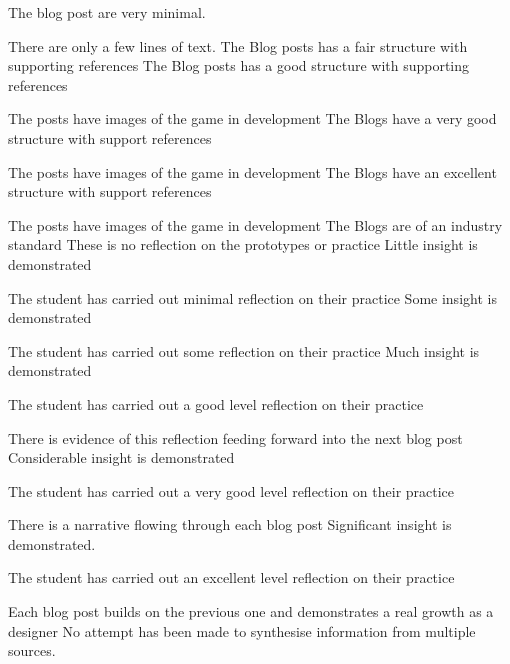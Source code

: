\documentclass{../../fal_assignment}
\begin{document}
\begin{markingrubric}
	\grade\fail	The blog post are very minimal.
	\par		There are only a few lines of text.
	\grade	    The Blog posts has a fair structure with supporting references
	\grade		The Blog posts has a good structure with supporting references
	\par		The posts have images of the game in development
	\grade		The Blogs have a very good structure with support references
	\par			The posts have images of the game in development
	\grade		The Blogs have an excellent structure with support references
	\par			The posts have images of the game in development
	\grade		The Blogs are of an industry standard
	\grade\fail These is no reflection on the prototypes or practice
	\grade		Little insight is demonstrated
	\par		The student has carried out minimal reflection on their practice
	\grade		Some insight is demonstrated
	\par		The student has carried out some reflection on their practice
	\grade		Much insight is demonstrated
	\par		The student has carried out a good level reflection on their practice
	\par        There is evidence of this reflection feeding forward into the next blog post
	\grade		Considerable insight is demonstrated
	\par		The student has carried out a very good level reflection on their practice
	\par         There is a narrative flowing through each blog post 
	\grade		Significant insight is demonstrated.
	\par		The student has carried out an excellent level reflection on their practice
	\par 		Each blog post builds on the previous one and demonstrates a real growth as a designer
	\grade\fail No attempt has been made to synthesise information from multiple sources.

\end{markingrubric}
\end{document}
